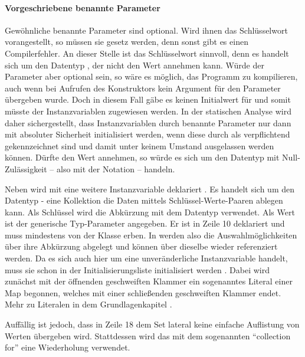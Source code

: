 \paragraph{Vorgeschriebene benannte Parameter}

Gewöhnliche benannte Parameter sind optional.
Wird ihnen das Schlüsselwort  vorangestellt, so müssen sie gesetz werden, denn sonst gibt es einen Compilerfehler.
An dieser Stelle ist das  Schlüsselwort sinnvoll, denn es handelt sich um den Datentyp , der nicht den Wert  annehmen kann.
Würde der Parameter aber optional sein, so wäre es möglich, das Programm zu kompilieren, auch wenn bei Aufrufen des Konstruktors kein Argument für den Parameter übergeben wurde.
Doch in diesem Fall gäbe es keinen Initialwert für  und somit müsste der Instanzvariablen  zugewiesen werden.
In der statischen Analyse wird daher sichergestellt, dass Instanzvariablen durch benannte Parameter nur dann mit absoluter Sicherheit initialisiert werden, wenn diese durch   als verpflichtend gekennzeichnet sind und damit unter keinem Umstand ausgelassen werden können. 
Dürfte  den Wert  annehmen, so würde es sich um den Datentyp  mit Null-Zulässigkeit -- also mit der Notation  -- handeln.

Neben  wird mit  eine weitere Instanzvariable deklariert .
Es handelt sich um den Datentyp  - eine Kollektion die Daten mittels Schlüssel-Werte-Paaren ablegen kann.
Als Schlüssel wird die Abkürzung mit dem Datentyp  verwendet.
Als Wert ist der generische Typ-Parameter  angegeben.
Er ist in Zeile 10 deklariert und muss mindestens von der Klasse  erben.
In  werden also die Auswahlmöglichkeiten über  ihre Abkürzung abgelegt und können über dieselbe wieder referenziert werden.
 Da es sich auch hier um eine unveränderliche Instanzvariable handelt, muss sie schon in der Initialisierungsliste initialisiert werden .
Dabei wird zunächst mit der öffnenden geschweiften Klammer  ein sogenanntes Literal einer Map  begonnen, welches mit einer schließenden geschweiften Klammer  endet.
Mehr zu  Literalen in dem Grundlagenkapitel .



Auffällig ist jedoch, dass in Zeile 18 dem Set lateral keine einfache Auflistung von Werten übergeben wird.
Stattdessen wird das mit dem sogenannten \enquote{collection for} eine Wiederholung verwendet.



